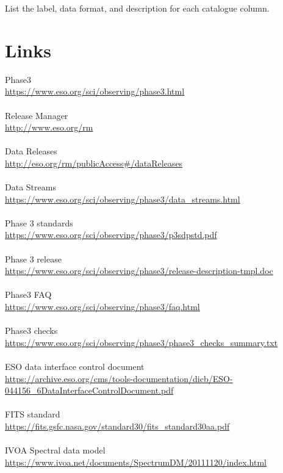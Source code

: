 \documentclass[a4paper,10pt]{book}
\begin{document}
List the label, data format, and description for each catalogue column.




\chapter{Links}
Phase3\\
\url{https://www.eso.org/sci/observing/phase3.html}\\
~\\
Release Manager\\
\url{http://www.eso.org/rm}\\
~\\
Data Releases\\
\url{http://eso.org/rm/publicAccess#/dataReleases}\\
~\\
Data Streams\\
\url{https://www.eso.org/sci/observing/phase3/data_streams.html}\\
~\\
Phase 3 standards\\
\url{https://www.eso.org/sci/observing/phase3/p3sdpstd.pdf}\\
~\\
Phase 3 release\\
\url{https://www.eso.org/sci/observing/phase3/release-description-tmpl.doc}\\
~\\
Phase3 FAQ\\
\url{https://www.eso.org/sci/observing/phase3/faq.html}\\
~\\
Phase3 checks\\
\url{https://www.eso.org/sci/observing/phase3/phase3_checks_summary.txt}\\
~\\
ESO data interface control document\\
\url{https://archive.eso.org/cms/tools-documentation/dicb/ESO-044156_6DataInterfaceControlDocument.pdf}\\
~\\
FITS standard\\
\url{https://fits.gsfc.nasa.gov/standard30/fits_standard30aa.pdf}\\
~\\
IVOA Spectral data model\\
\url{https://www.ivoa.net/documents/SpectrumDM/20111120/index.html}\\
~\\
\end{document}
